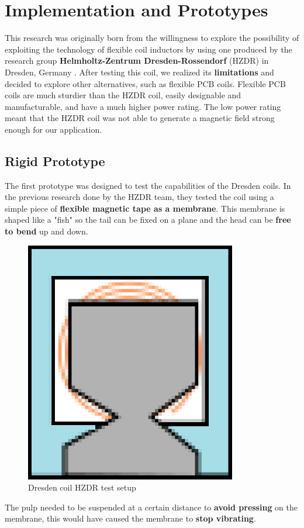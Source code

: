 \section{Implementation and Prototypes}
This research was originally born from the willingness to explore the possibility of exploiting the technology of flexible coil inductors by using one produced by the research group \textbf{Helmholtz-Zentrum Dresden-Rossendorf} (HZDR) in Dresden, Germany \cite{HZDR}.
After testing this coil, we realized its \textbf{limitations} and decided to explore other alternatives, such as flexible PCB coils.
Flexible PCB coils are much sturdier than the HZDR coil, easily designable and manufacturable, and have a much higher power rating.
The low power rating meant that the HZDR coil was not able to generate a magnetic field strong enough for our application.

\subsection{Rigid Prototype}
The first prototype was designed to test the capabilities of the Dresden coils.
In the previous research done by the HZDR team, they tested the coil using a simple piece of \textbf{flexible magnetic tape as a membrane}.
This membrane is shaped like a "fish" so the tail can be fixed on a plane and the head can be \textbf{free to bend} up and down.
\begin{figure}[H]
    \centering
    \includegraphics[width = 0.2\linewidth]{Figures/Dresden_test.png}
    \caption{Dresden coil HZDR test setup}
    \label{fig: Dresden_test}
\end{figure}
The pulp needed to be suspended at a certain distance to \textbf{avoid pressing} on the membrane, this would have caused the membrane to \textbf{stop vibrating}.

